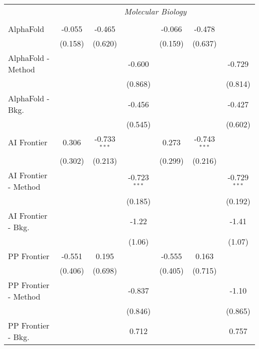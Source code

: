\begin{tabular}{lcccccc}
 & \multicolumn{6}{c}{\textit{Molecular Biology}} \\ \\
   AlphaFold            & -0.055  & -0.465         &                & -0.066  & -0.478         &   \\   
                        & (0.158) & (0.620)        &                & (0.159) & (0.637)        &   \\   
   AlphaFold - Method   &         &                & -0.600         &         &                & -0.729\\   
                        &         &                & (0.868)        &         &                & (0.814)\\   
   AlphaFold - Bkg.     &         &                & -0.456         &         &                & -0.427\\   
                        &         &                & (0.545)        &         &                & (0.602)\\   
   AI Frontier          & 0.306   & -0.733$^{***}$ &                & 0.273   & -0.743$^{***}$ &   \\   
                        & (0.302) & (0.213)        &                & (0.299) & (0.216)        &   \\   
   AI Frontier - Method &         &                & -0.723$^{***}$ &         &                & -0.729$^{***}$\\   
                        &         &                & (0.185)        &         &                & (0.192)\\   
   AI Frontier - Bkg.   &         &                & -1.22          &         &                & -1.41\\   
                        &         &                & (1.06)         &         &                & (1.07)\\   
   PP Frontier          & -0.551  & 0.195          &                & -0.555  & 0.163          &   \\   
                        & (0.406) & (0.698)        &                & (0.405) & (0.715)        &   \\   
   PP Frontier - Method &         &                & -0.837         &         &                & -1.10\\   
                        &         &                & (0.846)        &         &                & (0.865)\\   
   PP Frontier - Bkg.   &         &                & 0.712          &         &                & 0.757\\   

\end{tabular}
